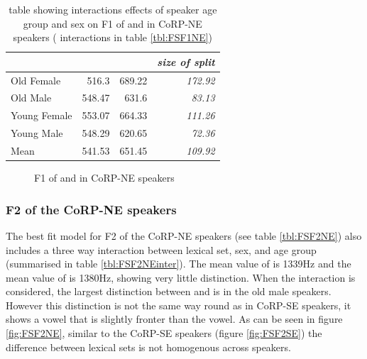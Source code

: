 \documentclass[../../../00.FullDoc/tex/ThesisSkeleton-draft2]{subfiles}
\begin{document}



\begin{table}[htbp]
	\centering
	\begin{tabular}{lrrr}
		\hline
		& \multicolumn{1}{l}{\foot{}} & \multicolumn{1}{l}{\strutt{}} & \multicolumn{1}{l}{\textit{size of split}} \\
		\hline
		Old Female & 516.3 & 689.22 & \textit{172.92} \\
		Old Male & 548.47 & 631.6 & \textit{83.13} \\
		Young Female & 553.07 & 664.33 & \textit{111.26} \\
		Young Male & 548.29 & 620.65 & \textit{72.36} \\
		Mean  & 541.53 & 651.45 & \textit{109.92} \\
		\hline
	\end{tabular}%
	\caption{table showing interactions effects of speaker age group and sex on F1 of \foot{} and \strutt{} in CoRP-NE speakers ( interactions in table \ref{tbl:FSF1NE})}
	\label{tbl:FSF1NEinter}%
\end{table}%

\begin{figure}[h]
	
	\caption{F1 of \foot{} and \strutt{} in CoRP-NE speakers} \label{fig:FSF1NE}
\end{figure}


\subsubsection{F2 of the CoRP-NE speakers} \label{subsubsec:NEF2}
The best fit model for F2 of the CoRP-NE speakers (see table \ref{tbl:FSF2NE}) also includes a three way interaction between lexical set, sex, and age group (summarised in table \ref{tbl:FSF2NEinter}). The mean value of \foot{} is 1339Hz and the mean value of \strutt{} is 1380Hz, showing very little distinction. When the interaction is considered, the largest distinction between \foot{} and \strutt is in the old male speakers. However this distinction is not the same way round as in CoRP-SE speakers, it shows a \strutt{} vowel that is slightly fronter than the \foot{} vowel.
As can be seen in figure \ref{fig:FSF2NE}, similar to the CoRP-SE speakers (figure \ref{fig:FSF2SE}) the difference between lexical sets is not homogenous across speakers.


\end{document}
